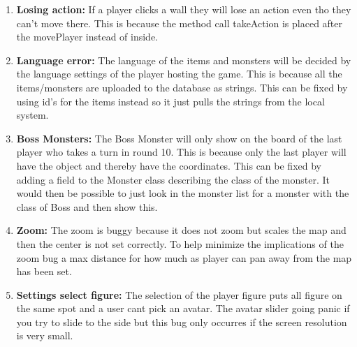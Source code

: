 \begin{enumerate}
	\item \textbf{Losing action:} If a player clicks a wall they will lose an action even tho they can't move there. This is because the method call takeAction is placed after the movePlayer instead of inside.
	
	\item \textbf{Language error:} The language of the items and monsters will be decided by the language settings of the player hosting the game. This is because all the items/monsters are uploaded to the database as strings. This can be fixed by using id's for the items instead so it just pulls the strings from the local system.
	
	\item \textbf{Boss Monsters:} The Boss Monster will only show on the board of the last player who takes a turn in round 10. This is because only the last player will have the object and thereby have the coordinates. This can be fixed by adding a field to the Monster class describing the class of the monster. It would then be possible to just look in the monster list for a monster with the class of Boss and then show this.%
	
	\item \textbf{Zoom:} The zoom is buggy because it does not zoom but scales the map and then the center is not set correctly. To help minimize the implications of the zoom bug a max distance for how much as player can pan away from the map has been set.

	\item \textbf{Settings select figure:} The selection of the player figure puts all figure on the same spot and a user cant pick an avatar. The avatar slider going panic if you try to slide to the side but this bug only occurres if the screen resolution is very small.
	
\end{enumerate}